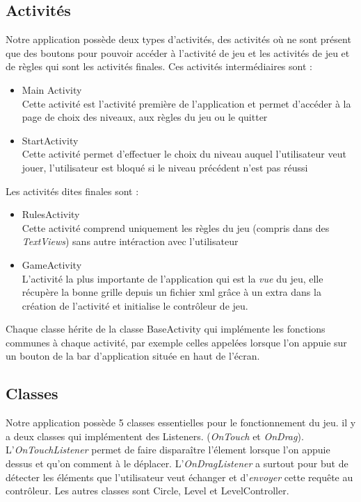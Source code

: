 \subsection{Activités}
Notre application possède deux types d'activités, des activités où ne sont présent que des boutons pour pouvoir accéder à l'activité de jeu et les activités de jeu et de règles qui sont les activités finales. Ces activités intermédiaires sont :
\begin{itemize}
\item Main Activity \\
Cette activité est l'activité première de l'application et permet d'accéder à la page de choix des niveaux,  aux règles du jeu ou  le quitter
\item StartActivity \\
Cette activité permet d'effectuer le choix du niveau auquel l'utilisateur veut jouer, l'utilisateur est bloqué si le niveau précédent n'est pas réussi
\end{itemize}
Les activités dites finales sont : 
\begin{itemize}
\item RulesActivity \\
Cette activité comprend uniquement les règles du jeu (compris dans des \textit{TextViews}) sans autre intéraction avec l'utilisateur
\item GameActivity \\
L'activité la plus importante de l'application qui est la \textit{vue} du jeu, elle récupère la bonne  grille depuis un fichier xml grâce à un extra dans la création de l'activité et initialise le contrôleur de jeu.
\end{itemize}
Chaque classe hérite de la classe BaseActivity qui implémente les fonctions communes à chaque activité, par exemple celles appelées lorsque l'on appuie sur un bouton de la bar d'application située en haut de l'écran.


\subsection{Classes}
Notre application possède 5 classes essentielles pour le fonctionnement du jeu. il y a deux classes qui implémentent des Listeners. (\textit{OnTouch} et \textit{OnDrag}). L'\textit{OnTouchListener} permet de faire disparaître l'élement lorsque l'on appuie dessus et qu'on comment à le déplacer.   L'\textit{OnDragListener} a surtout pour but de détecter les éléments que l'utilisateur veut échanger et d'\textit{envoyer} cette requête au contrôleur. Les autres classes sont Circle, Level et LevelController.
